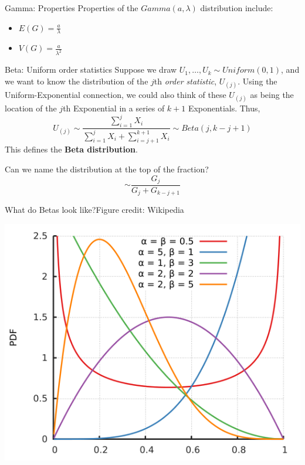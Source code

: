 \documentclass{beamer}
\begin{document}
\begin{frame}{Gamma: Properties}
Properties of the $Gamma(a,\lambda)$ distribution include:
\begin{itemize}
\item $E(G)=\frac{a}{\lambda}$
\item $V(G)=\frac{a}{\lambda^2}$
\end{itemize}
\end{frame}

\begin{frame}{Beta: Uniform order statistics}
Suppose we draw $U_1,\dots,U_k\sim Uniform(0,1)$, and we want to know the distribution of the $j$th \emph{order statistic}, $U_{(j)}$. Using the Uniform-Exponential connection, we could also think of these $U_{(j)}$ as being the location of the $j$th Exponential in a series of $k+1$ Exponentials. Thus,
$$U_{(j)}\sim \frac{\sum_{i=1}^j X_i}{\sum_{i=1}^{j} X_i+\sum_{i=j+1}^{k+1} X_i}\sim Beta(j,k-j+1)$$
This defines the \textbf{Beta distribution}.

Can we name the distribution at the top of the fraction?
\pause
$$\sim \frac{G_j}{G_j+G_{k-j+1}}$$
\end{frame}

\begin{frame}{What do Betas look like?}{Figure credit: Wikipedia}
\begin{center}\includegraphics[scale=.3]{figures/BetaPDF.png}\end{center}
\end{frame}
\end{document}
